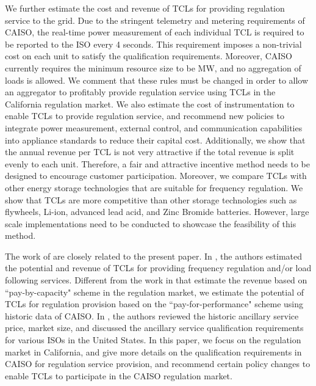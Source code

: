 \documentclass[onecolumn,journal]{IEEEtran}
\begin{document}
We further estimate the cost and revenue of \acp{TCL} for providing regulation service to the grid. Due to the stringent telemetry and metering requirements of \ac{CAISO}, the real-time power measurement of each individual \ac{TCL} is required to be reported to the ISO every 4 seconds. This requirement imposes a non-trivial cost on each unit to satisfy the qualification requirements. Moreover, CAISO currently requires the minimum resource size to be  MW, and no aggregation of loads is allowed. We comment that these rules must be changed in order to allow an aggregator to profitably provide regulation service using TCLs in the California regulation market. We also estimate the cost of instrumentation to enable TCLs to provide regulation service, and recommend new policies to integrate power measurement, external control, and communication capabilities into appliance standards to reduce their capital cost. Additionally, we show that the annual revenue per \ac{TCL} is not very attractive if the total revenue is split evenly to each unit.  Therefore, a fair and attractive incentive method needs to be designed to encourage customer participation.  Moreover, we compare \acp{TCL} with other energy storage technologies that are suitable for frequency regulation. We show that \acp{TCL} are more competitive than other storage technologies such as flywheels, Li-ion, advanced lead acid, and Zinc Bromide batteries. However, large scale implementations need to be conducted to showcase the feasibility of this method. 


The work of \cite{mathieu_revenue, HH_BS_KP_TV_ACC:2014,macdonald2012demand} are closely related to the present paper. In \cite{mathieu_revenue,HH_BS_KP_TV_ACC:2014}, the authors estimated the potential and revenue of \acp{TCL} for providing frequency regulation and/or load following services. Different from the work in \cite{mathieu_revenue,HH_BS_KP_TV_ACC:2014} that estimate the revenue based on ``pay-by-capacity" scheme in the regulation market, we estimate the potential of TCLs for regulation provision based on the ``pay-for-performance" scheme using historic data of \ac{CAISO}. In \cite{macdonald2012demand}, the authors reviewed the historic ancillary service price, market size, and discussed the ancillary service qualification requirements for various ISOs in the United States. In this paper,  we focus on the regulation market in California, and give more details on the qualification requirements in CAISO for regulation service provision, and recommend certain policy changes to enable TCLs to participate in the CAISO regulation market. 
\end{document}
